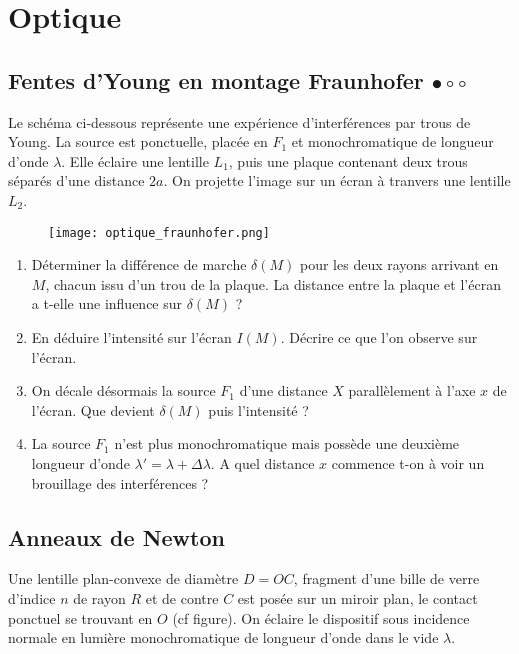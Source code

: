 \chapter{Optique}

\newpage

\section{Fentes d'Young en montage Fraunhofer $\bullet\circ\circ$}

Le schéma ci-dessous représente une expérience d’interférences par trous de Young. La source est ponctuelle, placée en $F_1$ et monochromatique de longueur d’onde $\lambda$. Elle éclaire une lentille $L_1$, puis une plaque contenant deux trous séparés d'une distance $2a$. On projette l'image sur un écran à tranvers une lentille $L_2$.

\begin{figure}[h]
\centering
  \texttt{[image: optique\_fraunhofer.png]}
\end{figure}

\begin{enumerate}

	\item Déterminer la différence de marche $\delta(M)$ pour les deux rayons arrivant en $M$, chacun issu d'un trou de la plaque. La distance entre la plaque et l'écran a t-elle une influence sur $\delta(M)$ ?
	
	\item En déduire l'intensité sur l'écran $I(M)$. Décrire ce que l'on observe sur l'écran.
	
	\item On décale désormais la source $F_1$ d'une distance $X$ parallèlement à l'axe $x$ de l'écran. Que devient $\delta(M)$ puis l'intensité ? 
	
	\item La source $F_1$ n'est plus monochromatique mais possède une deuxième longueur d'onde $\lambda'=\lambda+\Delta \lambda$. A quel distance $x$ commence t-on à voir un brouillage des interférences ?

\end{enumerate}

\newpage

\section{Anneaux de Newton}

Une lentille plan-convexe de diamètre $D=OC$, fragment d'une bille de verre d'indice $n$ de rayon $R$ et de contre $C$ est posée sur un miroir plan, le contact ponctuel se trouvant en $O$ (cf figure). On éclaire le dispositif sous incidence normale en lumière monochromatique de longueur d'onde dans le vide $\lambda$.

